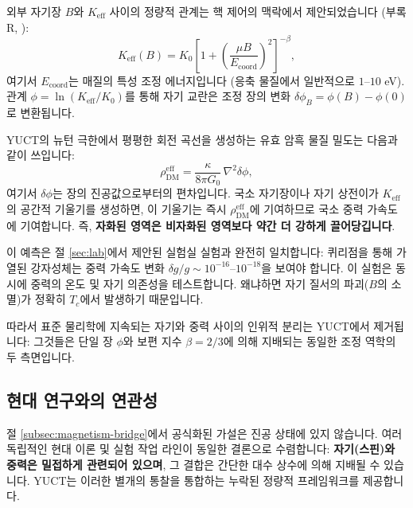 \documentclass[11pt,a4paper]{article}
\newcommand{\Keff}{K_{\mathrm{eff}}}
\begin{document}
	외부 자기장 $B$와 $\Keff$ 사이의 정량적 관계는 핵 제어의 맥락에서 제안되었습니다 (부록 R, \cite{AppendixR}):
	\begin{equation}
		\Keff(B) = K_0 \left[ 1 + \left( \frac{\mu B}{E_{\mathrm{coord}}} \right)^2 \right]^{-\beta},
		\label{eq:keff-B}
	\end{equation}
	여기서 $E_{\mathrm{coord}}$는 매질의 특성 조정 에너지입니다 (응축 물질에서 일반적으로 $1$--$10$ eV). 관계 $\phi = \ln(\Keff/K_0)$를 통해 자기 교란은 조정 장의 변화 $\delta\phi_B = \phi(B) - \phi(0)$로 변환됩니다.
	
	YUCT의 뉴턴 극한에서 평평한 회전 곡선을 생성하는 유효 암흑 물질 밀도는 다음과 같이 쓰입니다:
	\begin{equation}
		\rho_{\mathrm{DM}}^{\mathrm{eff}} = \frac{\kappa}{8\pi G_0}\,\nabla^2\delta\phi,
		\label{eq:rho-dm}
	\end{equation}
	여기서 $\delta\phi$는 장의 진공값으로부터의 편차입니다. 국소 자기장이나 자기 상전이가 $\Keff$의 공간적 기울기를 생성하면, 이 기울기는 즉시 $\rho_{\mathrm{DM}}^{\mathrm{eff}}$에 기여하므로 국소 중력 가속도에 기여합니다. 즉, \textbf{자화된 영역은 비자화된 영역보다 약간 더 강하게 끌어당깁니다}.
	
	이 예측은 절 \ref{sec:lab}에서 제안된 실험실 실험과 완전히 일치합니다: 퀴리점을 통해 가열된 강자성체는 중력 가속도 변화 $\delta g/g \sim 10^{-16}$–$10^{-18}$을 보여야 합니다. 이 실험은 동시에 중력의 온도 및 자기 의존성을 테스트합니다. 왜냐하면 자기 질서의 파괴($B$의 소멸)가 정확히 $T_c$에서 발생하기 때문입니다.
	
	따라서 표준 물리학에 지속되는 자기와 중력 사이의 인위적 분리는 YUCT에서 제거됩니다: 그것들은 단일 장 $\phi$와 보편 지수 $\beta = 2/3$에 의해 지배되는 동일한 조정 역학의 두 측면입니다.
	
	\subsection{현대 연구와의 연관성}
	\label{subsec:mainstream}
	
	절 \ref{subsec:magnetism-bridge}에서 공식화된 가설은 진공 상태에 있지 않습니다. 여러 독립적인 현대 이론 및 실험 작업 라인이 동일한 결론으로 수렴합니다: \textbf{자기(스핀)와 중력은 밀접하게 관련되어 있으며}, 그 결합은 간단한 대수 상수에 의해 지배될 수 있습니다. YUCT는 이러한 별개의 통찰을 통합하는 누락된 정량적 프레임워크를 제공합니다.
	
\end{document}

